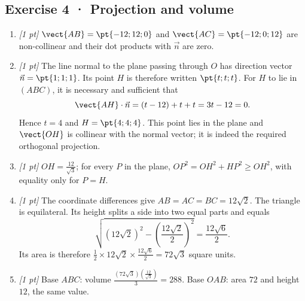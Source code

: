\subsection*{Exercise 4 · Projection and volume}\begin{enumerate}

\item \textit{[1 pt]} $\vect{AB}=\pt{-12;12;0}$ and $\vect{AC}=\pt{-12;0;12}$ are non-collinear and their dot products with $\vec n$ are zero.

\item \textit{[1 pt]} The line normal to the plane passing through $O$ has direction vector $\vec n=\pt{1;1;1}$. Its point $H$ is therefore written $\pt{t;t;t}$. For $H$ to lie in $(ABC)$, it is necessary and sufficient that
\[\vect{AH}\cdot\vec n=(t-12)+t+t=3t-12=0.\]
Hence $t=4$ and $H=\pt{4;4;4}$. This point lies in the plane and $\vect{OH}$ is collinear with the normal vector; it is indeed the required orthogonal projection.

\item \textit{[1 pt]} $OH=\frac{12}{\sqrt{3}}$; for every $P$ in the plane, $OP^2=OH^2+HP^2\ge OH^2$, with equality only for $P=H$.

\item \textit{[1 pt]} The coordinate differences give $AB=AC=BC=12\sqrt2$. The triangle is equilateral. Its height splits a side into two equal parts and equals
\[\sqrt{(12\sqrt2)^2-(\frac{12\sqrt{2}}{2})^2}=\frac{12\sqrt6}{2}.\]
Its area is therefore $\frac12\times 12\sqrt2\times\frac{12\sqrt6}{2}=72\sqrt3$ square units.

\item \textit{[1 pt]} Base $ABC$: volume $\frac{(72\sqrt3)(\frac{12}{\sqrt{3}})}{3}=288$. Base $OAB$: area $72$ and height $12$, the same value.

\end{enumerate}

\fi

\fi

